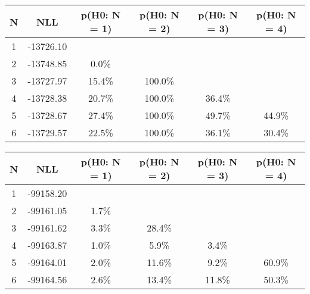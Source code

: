 \begin{table}[htb]
	\begin{center}
{\footnotesize\renewcommand{\arraystretch}{1.4}
		\begin{tabular}{cc||cccc}
			N & NLL & p(H0: N = 1) & p(H0: N = 2) & p(H0: N = 3) & p(H0: N = 4)\\ 
		\hline
1 & -13726.10 & & & & \\
2 & -13748.85 & 0.0\% & & & \\
3 & -13727.97 & 15.4\% & 100.0\% & & \\
4 & -13728.38 & 20.7\% & 100.0\% & 36.4\% & \\
5 & -13728.67 & 27.4\% & 100.0\% & 49.7\% & 44.9\% \\
6 & -13729.57 & 22.5\% & 100.0\% & 36.1\% & 30.4\% \\
	\end{tabular}
		\label{tab:lab}
	}
	\end{center}\end{table}

\begin{table}[htb]
	\begin{center}
{\footnotesize\renewcommand{\arraystretch}{1.4}
		\begin{tabular}{cc||cccc}
			N & NLL & p(H0: N = 1) & p(H0: N = 2) & p(H0: N = 3) & p(H0: N = 4)\\ 
		\hline
1 & -99158.20 & & & & \\
2 & -99161.05 & 1.7\% & & & \\
3 & -99161.62 & 3.3\% & 28.4\% & & \\
4 & -99163.87 & 1.0\% & 5.9\% & 3.4\% & \\
5 & -99164.01 & 2.0\% & 11.6\% & 9.2\% & 60.9\% \\
6 & -99164.56 & 2.6\% & 13.4\% & 11.8\% & 50.3\% \\
	\end{tabular}
		\label{tab:lab}
	}
	\end{center}\end{table}

